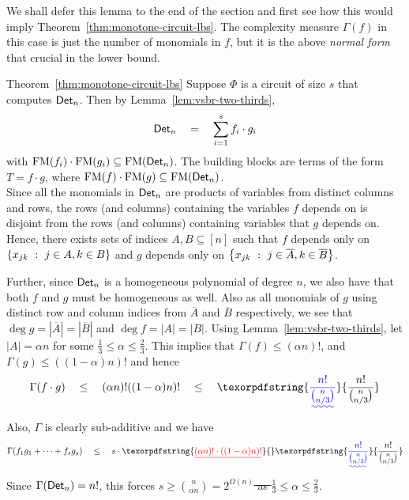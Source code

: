 \documentclass{birkjour}
\newcommand{\FM}{\mathrm{FM}}
\newcommand{\spaced}[1]{\quad#1\quad}
\providecommand{\DIFaddtex}[1]{{\protect\color{blue}\uwave{#1}}} %
\providecommand{\DIFdeltex}[1]{{\protect\color{red}\sout{#1}}}                      %
\providecommand{\DIFaddbegin}{} %
\providecommand{\DIFaddend}{} %
\providecommand{\DIFdelbegin}{} %
\providecommand{\DIFdelend}{} %
\providecommand{\DIFadd}[1]{\texorpdfstring{\DIFaddtex{#1}}{#1}} %
\providecommand{\DIFdel}[1]{\texorpdfstring{\DIFdeltex{#1}}{}} %
\begin{document}
We shall defer this lemma to the end of the section and first see how
this would imply Theorem~\ref{thm:monotone-circuit-lbs}. The complexity measure $\Gamma(f)$ in this case is just the number of monomials in $f$, but it is the above \emph{normal form} that \DIFaddbegin \DIFadd{is }\DIFaddend crucial in the lower bound. 

\begin{proofof}{Theorem~\ref{thm:monotone-circuit-lbs}}
Suppose $\Phi$ is a circuit of size $s$ that computes $\mathsf{Det}_n$. Then by Lemma~\ref{lem:vsbr-two-thirds}, 
$$
\mathsf{Det}_n \quad=\quad \sum_{i=1}^s f_i \cdot g_i
$$
with $\FM(f_i)\cdot \FM(g_i) \subseteq \FM(\Det_n)$. The building blocks are terms of the form $T = f\cdot g$, where $\FM(f)  \cdot \FM(g) \subseteq \FM(\Det_n)$. \\

Since all the monomials in $\mathsf{Det}_n$ are products of variables from
distinct columns and rows, the rows (and columns) containing the
variables $f$ depends on is disjoint from the rows (and columns)
containing variables that $g$ depends on. Hence, there exists sets of indices $A,B
\subseteq [n]$ such that $f$ depends only on $\left\{{x_{jk}}\ : \ {j\in
  A, k\in B}\right\}$ and $g$ depends only on
$\left\{{x_{jk}}\ : \ {j\in\overline{A}, k\in
  \overline{B}}\right\}$.

Further, since $\mathsf{Det}_n$ is a homogeneous polynomial of degree $n$, we also have that both $f$ and $g$ must be homogeneous as well. Also as all monomials of $g$ using distinct row and column indices from $\overline{A}$ and $\overline{B}$ respectively, we see that $\deg g = |\overline{A}| = |\overline{B}|$ and $\deg f = |A| = |B|$. Using Lemma~\ref{lem:vsbr-two-thirds}, let $|A| = \alpha n$ for some $\frac{1}{3}\leq \alpha \leq \frac{2}{3}$. This implies that $\Gamma(f)\leq (\alpha n)!$, and $\Gamma(g)\leq ((1-\alpha)n)!$ and hence
$$\Gamma(f\cdot g) \quad \leq\quad (\alpha n)! ((1-\alpha)n)! \DIFaddbegin \spaced{\leq} \DIFadd{\frac{n!}{\binom{n}{n/3}} }\DIFaddend $$
\DIFaddbegin \DIFadd{as $\frac{1}{3}\leq \alpha \leq \frac{2}{3}$.
}\DIFaddend Also, $\Gamma$ is clearly sub-additive and we have $$\Gamma(f_1g_1 + \dots + f_s g_s) \spaced{\leq} s \cdot \DIFdelbegin \DIFdel{(\alpha n)!\cdot ((1-\alpha)n)!}\DIFdelend \DIFaddbegin \DIFadd{\frac{n!}{\binom{n}{n/3}}}\DIFaddend $$ 
Since $\Gamma(\mathsf{Det}_n) = n!$, this forces \DIFdelbegin \DIFdel{$s \geq
\binom{n}{\alpha n} = 2^{\Omega(n)}$ as $\frac{1}{3}\leq \alpha \leq
\frac{2}{3}$}\DIFdelend \DIFaddbegin \DIFadd{$s \geq
\binom{n}{n/3} = 2^{\Omega(n)}$}\DIFaddend .
\end{proofof}
\end{document}
